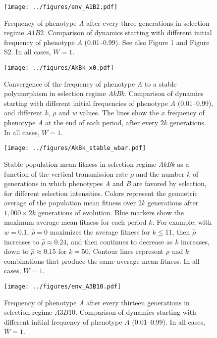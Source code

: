 \documentclass[]{article}
\newcommand{\beginsupplement}{%
        \setcounter{table}{0}
        \renewcommand{\thetable}{S\arabic{table}}%
        \setcounter{figure}{0}
        \renewcommand{\thefigure}{S\arabic{figure}}%
     }
\begin{document}
\beginsupplement

\begin{figure}
\centering
\texttt{[image: ../figures/env\_A1B2.pdf]}
\caption{Frequency of phenotype \emph{A} after every three generations in
selection regime $A1B2$. Comparison of dynamics starting with
different initial frequency of phenotype \(A\) (0.01--0.99).
See also Figure 1 and Figure S2. In all cases, $W=1$.}\label{fig:env_A1B2}
\end{figure}

\begin{figure}
\centering
\texttt{[image: ../figures/AkBk\_x0.pdf]}
\caption{Convergence of the frequency of phenotype \emph{A} to a stable polymorphism in selection regime \emph{AkBk}.
Comparison of dynamics starting with different initial frequencies of phenotype \(A\) (0.01--0.99), and different $k$, $\rho$ and $w$ values.
The lines show the $x$ frequency of phenotype \emph{A} at the end of each period, after every $2k$ generations.
In all cases, $W=1$.}\label{fig:AkBk_x0}
\end{figure}

\begin{figure}
\centering
\texttt{[image: ../figures/AkBk\_stable\_wbar.pdf]}
\caption{Stable population mean fitness in selection regime \emph{AkBk} as a function of the vertical transmission rate \(\rho\) and the number \(k\) of generations in which phenotypes \emph{A} and \emph{B} are favored by selection, for different selection intensities.
Colors represent the geometric average of the population mean fitness over \(2k\) generations after \(1,000 \times 2k\) generations of evolution.
Blue markers show the maximum average mean fitness for each period \(k\).
For example, with \(w=0.1\), \(\hat{\rho}=0\) maximizes the average fitness for \(k \le 11\), then \(\hat{\rho}\) increases to \(\hat{\rho} \approx 0.24\), and then continues to decrease as \(k\) increases, down to \(\hat{\rho} \approx 0.15\) for \(k=50\).
Contour lines represent \(\rho\) and \(k\) combinations that produce the same average mean fitness. 
In all cases, $W=1$.}\label{fig:AkBk_stable_wbar}
\end{figure}

\begin{figure}
\centering
\texttt{[image: ../figures/env\_A3B10.pdf]}
\caption{Frequency of phenotype \emph{A} after every thirteen generations in
selection regime $A3B10$. Comparison of dynamics starting with
different initial frequency of phenotype \(A\) (0.01--0.99).
In all cases, $W=1$.}\label{fig:env_A3B10}
\end{figure}
\end{document}
